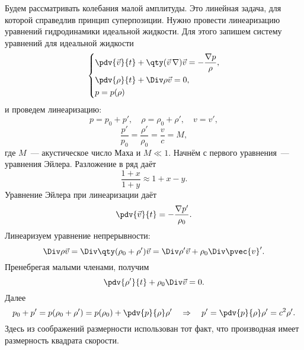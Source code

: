 Будем рассматривать колебания малой амплитуды. Это  линейная задача, для которой справедлив принцип суперпозиции. Нужно провести линеаризацию уравнений гидродинамики идеальной жидкости. Для этого запишем систему уравнений для идеальной жидкости
\begin{equation}
	\left\{
	\begin{aligned}
	    &\pdv{\vec{v}}{t}+ \qty(\vec{v}\,\nabla)\vec{v} = - \frac{\nabla p}{\rho},\\
	    &\pdv{\rho}{t}+\Div \rho \vec{v} = 0,\\
	    &p=p(\rho)
	\end{aligned}
	\right.
\end{equation}
и проведем линеаризацию:
\begin{equation}
    p=p_0+p', \quad \rho = \rho_0+\rho', \quad v=v',
\end{equation}
\begin{equation}
    \frac{p'}{p_0} = \frac{\rho'}{\rho_0} = \frac{v}{c} = M,
\end{equation}
где $M$~--- акустическое число Маха и $M \ll 1$. Начнём с первого уравнения~--- уравнения Эйлера. Разложение в ряд даёт
\begin{equation}
    \frac{1+x}{1+y}\approx 1+x-y.
\end{equation}
Уравнение Эйлера при линеаризации даёт
\begin{equation}
    \pdv{\vec{v}}{t} = -\frac{\nabla p'}{\rho_0}.
\end{equation}
Линеаризуем уравнение непрерывности:
\begin{equation}
    \Div \rho \vec{v} = \Div \qty(\rho_0+\rho')\vec{v} =
    \Div \rho' \vec{v} + \rho_0 \Div \pvec{v}'.
\end{equation}
Пренебрегая малыми членами, получим
\begin{equation}
    \pdv{\rho'}{t}+\rho_0 \Div \vec{v} = 0.
\end{equation}
Далее
\begin{equation}
    p_0+p' = p (\rho_0 + \rho') = p (\rho_0)+
    \pdv{p}{\rho}\rho'
    \quad\Rightarrow\quad
    p' = \pdv{p}{\rho} \rho' = c^2 \rho'.
\end{equation}
Здесь из соображений размерности использован тот факт, что производная имеет размерность квадрата скорости.

